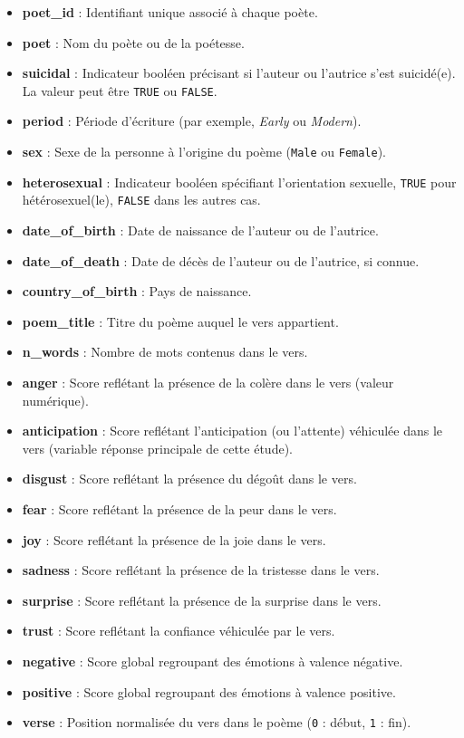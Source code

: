 \documentclass[12pt,a4paper]{article}
\begin{document}
	\begin{itemize}
		\item \textbf{poet\_id} : Identifiant unique associé à chaque poète.
		\item \textbf{poet} : Nom du poète ou de la poétesse.
		\item \textbf{suicidal} : Indicateur booléen précisant si l'auteur ou l'autrice
		s'est suicidé(e). La valeur peut être \texttt{TRUE} ou \texttt{FALSE}.
		\item \textbf{period} : Période d'écriture (par exemple, \textit{Early} ou \textit{Modern}).
		\item \textbf{sex} : Sexe de la personne à l'origine du poème (\texttt{Male} ou \texttt{Female}).
		\item \textbf{heterosexual} : Indicateur booléen spécifiant l’orientation sexuelle,
		\texttt{TRUE} pour hétérosexuel(le), \texttt{FALSE} dans les autres cas.
		\item \textbf{date\_of\_birth} : Date de naissance de l'auteur ou de l'autrice.
		\item \textbf{date\_of\_death} : Date de décès de l'auteur ou de l'autrice, si connue.
		\item \textbf{country\_of\_birth} : Pays de naissance.
		\item \textbf{poem\_title} : Titre du poème auquel le vers appartient.
		\item \textbf{n\_words} : Nombre de mots contenus dans le vers.
		\item \textbf{anger} : Score reflétant la présence de la colère dans le vers (valeur numérique).
		\item \textbf{anticipation} : Score reflétant l’anticipation (ou l'attente) véhiculée dans le vers
		(variable réponse principale de cette étude).
		\item \textbf{disgust} : Score reflétant la présence du dégoût dans le vers.
		\item \textbf{fear} : Score reflétant la présence de la peur dans le vers.
		\item \textbf{joy} : Score reflétant la présence de la joie dans le vers.
		\item \textbf{sadness} : Score reflétant la présence de la tristesse dans le vers.
		\item \textbf{surprise} : Score reflétant la présence de la surprise dans le vers.
		\item \textbf{trust} : Score reflétant la confiance véhiculée par le vers.
		\item \textbf{negative} : Score global regroupant des émotions à valence négative.
		\item \textbf{positive} : Score global regroupant des émotions à valence positive.
		\item \textbf{verse} : Position normalisée du vers dans le poème (\texttt{0} : début, \texttt{1} : fin).
	\end{itemize}
	
\end{document}
